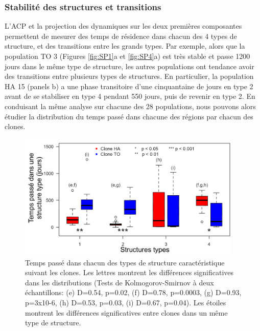 \subsubsection{Stabilité des structures et transitions}

L'ACP et la projection des dynamiques sur les deux premières composantes
permettent de mesurer des temps de résidence dans chacun des 4 types de
structure, et des transitions entre les grands types. Par exemple, alors que la
population TO 3 (Figures \ref{fig:SP1}a et \ref{fig:SP4}a) est très stable et
passe 1200 jours dans le même type de structure, les autres populations ont
tendance avoir des transitions entre plusieurs types de structures. En
particulier, la population HA 15 (panels b) a une phase transitoire d'une
cinquantaine de jours en type 2 avant de se stabiliser en type 4 pendant 550
jours, puis de revenir en type 2. En conduisant la même analyse sur chacune des
28 populations, nous pouvons alors étudier la distribution du temps passé dans
chacune des régions par chacun des clones. 

\begin{figure}[!ht]
\begin{center}
\includegraphics[width=0.95\textwidth]{1_CorpsDeThese/Resumes/Fig/SP05}
\caption[Temps de
résidence dans les structures types]{Temps passé dans chacun des types de
structure caractéristique suivant les clones. Les lettres montrent les
différences significatives dans les distributions (Tests de Kolmogorov-Smirnov
à deux échantillons: (e) D=0.54, p=0.02, (f) D=0.78, p=0.0003, (g) D=0.93,
p=3x10-6, (h) D=0.53, p=0.03, (i) D=0.67, p=0.04). Les étoiles montrent les
différences significatives entre clones dans un même type de structure.}
\label{fig:SP5}
\end{center}
\end{figure}

